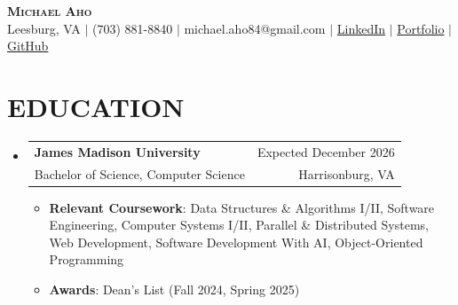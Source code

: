 \documentclass[letterpaper,11pt]{article}
\makeatletter
\newcommand{\resumeItem}[1]{
  \item\small{
    {#1 \vspace{-2pt}}
  }
}
\newcommand{\resumeSubheading}[4]{
  \vspace{-2pt}\item
    \begin{tabular*}{1\textwidth}[t]{l@{\extracolsep{\fill}}r}
      \textbf{#1} & #2 \\
      {\small#3} & {\small #4} \\
    \end{tabular*}\vspace{-7pt}
}
\newcommand{\resumeSubHeadingListStart}{\begin{itemize}[leftmargin=0in, label={}]}
\newcommand{\resumeSubHeadingListEnd}{\end{itemize}}
\newcommand{\resumeItemListStart}{\begin{itemize}}
\newcommand{\resumeItemListEnd}{\end{itemize}\vspace{-4pt}}
\makeatother
\begin{document}
\begin{center}
    \textbf{\Huge  \scshape Michael Aho} \\ \vspace{3pt}
    \normalsize Leesburg, VA $|$ (703) 881-8840 $|$ michael.aho84@gmail.com $|$ 
    \href{https://www.linkedin.com/in/michael-a-aho/}{LinkedIn} $|$
    \href{https://michaelaho1.github.io/Portfolio/}{Portfolio} $|$
    \href{https://github.com/MichaelAho1}{GitHub}
\end{center}
\vspace{-12pt}

\section{EDUCATION}
  \resumeSubHeadingListStart
    \resumeSubheading
      {James Madison University}{Expected December 2026}
      {Bachelor of Science, Computer Science}{Harrisonburg, VA}
      \resumeItemListStart
        \resumeItem{\textbf{Relevant Coursework}: Data Structures \& Algorithms I/II, Software Engineering, Computer Systems I/II, Parallel \& Distributed Systems, Web Development, Software Development With AI, Object-Oriented Programming}
        \resumeItem{\textbf{Awards}: Dean’s List (Fall 2024, Spring 2025)}
      \resumeItemListEnd
  \resumeSubHeadingListEnd

\end{document}
